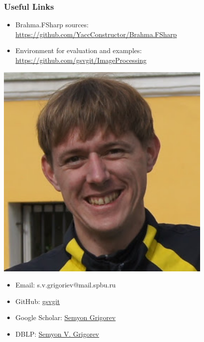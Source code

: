 \documentclass[xcolor=table,aspectratio=169]{beamer}
\begin{document}
\begin{frame}[fragile]
  \frametitle{Useful Links}
  \begin{minipage}{0.70\textwidth}
  \begin{itemize}
    \item Brahma.FSharp sources: \url{https://github.com/YaccConstructor/Brahma.FSharp}
    \item Environment for evaluation and examples: \url{https://github.com/gsvgit/ImageProcessing}
  \end{itemize}
\end{minipage}
\begin{minipage}[t]{0.29\textwidth}
  \begin{center}
\includegraphics[width=0.8\textwidth]{pictures/SemyonGrigorev.jpg}
  \end{center}
  {\scriptsize
\begin{itemize}    
  \item Email: s.v.grigoriev@mail.spbu.ru
  \item GitHub: \href{https://github.com/gsvgit}{gsvgit}
  \item Google Scholar: \href{https://scholar.google.com/citations?hl=ru&user=kP4dqUAAAAAJ&view_op=list_works&sortby=pubdate}{Semyon Grigorev}
  \item DBLP: \href{https://dblp.org/pid/181/9903.html}{Semyon V. Grigorev}
\end{itemize}
  }
\end{minipage}
\end{frame}
\end{document}
